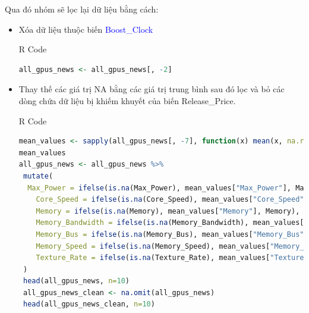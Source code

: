 \documentclass[a4paper]{article}
\newcommand{\gachdau}{\hspace*{1.5em}\ignorespaces}
\begin{document}
\newpage
            \gachdau
            Qua đó nhóm sẽ lọc lại dữ liệu bằng cách:
            \begin{itemize}[leftmargin=3.5em, itemsep=-0.15em] 
                \vspace{-7pt}
                \item \fontsize{13pt}{15pt}\selectfont Xóa dữ liệu thuộc biến \textcolor{blue}{Boost\_Clock}
\begin{mybox}{R Code}
    \begin{lstlisting}[language={R}] 
    all_gpus_news <- all_gpus_news[, -2]
    \end{lstlisting}
\end{mybox}
                \item \fontsize{13pt}{15pt}\selectfont Thay thế các giá trị NA bằng các giá trị trung bình sau đó lọc và bỏ các dòng chứa dữ liệu bị khiếm khuyết của biến Release\_Price. 
                    
\begin{mybox}{R Code}
\begin{lstlisting}[language={R}]
mean_values <- sapply(all_gpus_news[, -7], function(x) mean(x, na.rm = TRUE))
mean_values
all_gpus_news <- all_gpus_news %>%
 mutate(
  Max_Power = ifelse(is.na(Max_Power), mean_values["Max_Power"], Max_Power),
    Core_Speed = ifelse(is.na(Core_Speed), mean_values["Core_Speed"], Core_Speed),
    Memory = ifelse(is.na(Memory), mean_values["Memory"], Memory),
    Memory_Bandwidth = ifelse(is.na(Memory_Bandwidth), mean_values["Memory_Bandwidth"], Memory_Bandwidth),
    Memory_Bus = ifelse(is.na(Memory_Bus), mean_values["Memory_Bus"], Memory_Bus),
    Memory_Speed = ifelse(is.na(Memory_Speed), mean_values["Memory_Speed"], Memory_Speed),
    Texture_Rate = ifelse(is.na(Texture_Rate), mean_values["Texture_Rate"], Texture_Rate)
 )
 head(all_gpus_news, n=10)
 all_gpus_news_clean <- na.omit(all_gpus_news)
 head(all_gpus_news_clean, n=10)
\end{lstlisting}
\end{mybox}


\end{itemize}
\end{document}
